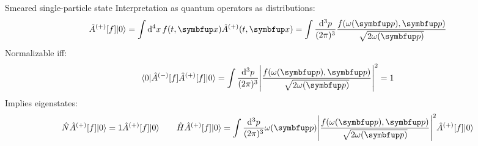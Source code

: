 \documentclass[aspectratio=169,usenames,dvipsnames]{beamer}
\begin{document}
	\begin{frame}{Smeared single-particle state}
		Interpretation as quantum operators as distributions:
		\begin{equation}
			\hat{A}^{(+)}[f]
			\ket{0}
			=
			\int\dd[4]{x}
			f(t,\vb{x})
			\hat{A}^{(+)}(t,\vb{x})
			=
			\int\frac{\dd[3]{p}}{(2\pi)^3}
			\frac{f\!\left(\omega(\vb{p}),\vb{p}\right)}{\sqrt{2\omega(\vb{p})}}
		\end{equation}
		Normalizable iff:
		\begin{equation}
			\bra{0}
			\hat{A}^{(-)}[f]
			\hat{A}^{(+)}[f]
			\ket{0}
			=
			\int\frac{\dd[3]{p}}{(2\pi)^3}
			\abs*{\frac{f\!\left(\omega(\vb{p}),\vb{p}\right)}{\sqrt{2\omega(\vb{p})}}}^2
			=
			1
		\end{equation}
		Implies eigenstates:
		\begin{equation}
			\hat{N}
			\hat{A}^{(+)}[f]
			\ket{0}
			=
			1
			\hat{A}^{(+)}[f]
			\ket{0}
			\qquad
			\hat{H}
			\hat{A}^{(+)}[f]
			\ket{0}
			=
			\int\frac{\dd[3]{p}}{(2\pi)^3}
			\omega(\vb{p})
			\abs*{\frac{f\!\left(\omega(\vb{p}),\vb{p}\right)}{\sqrt{2\omega(\vb{p})}}}^2
			\hat{A}^{(+)}[f]
			\ket{0}
		\end{equation}
	\end{frame}
	
\end{document}
